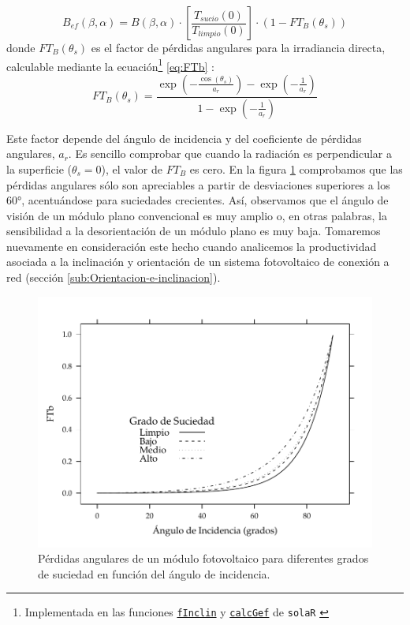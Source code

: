 \begin{equation}
B_{ef}(\beta,\alpha)=B(\beta,\alpha)\cdot\left[\frac{T_{sucio}(0)}{T_{limpio}(0)}\right]\cdot(1-FT_{B}(\theta_{s}))\label{eq:Bef}\end{equation}
donde $FT_{B}(\theta_{s})$
es el factor de pérdidas angulares para la irradiancia directa, calculable
mediante la ecuación\footnote{Implementada en las funciones
  \href{http://search.r-project.org/R/library/solaR/html/fInclin.html}{\texttt{fInclin}}
  y
  \href{http://search.r-project.org/R/library/solaR/html/calcGef.html}{\texttt{calcGef}}
  de \texttt{solaR} \cite{Perpinan2012b}} \ref{eq:FTb} \cite{Martin.Ruiz2001}: 
\begin{equation}
FT_{B}(\theta_{s})=\frac{\exp(-\frac{\cos(\theta_{s})}{a_{r}})-\exp(-\frac{1}{a_{r}})}{1-\exp(-\frac{1}{a_{r}})}
\label{eq:FTb}
\end{equation}


Este factor depende del ángulo de incidencia y del coeficiente de
pérdidas angulares, $a_{r}$. Es sencillo comprobar que cuando la
radiación es perpendicular a la superficie ($\theta_{s}=0$), el valor
de $FT_{B}$ es cero. En la figura \ref{fig:PerdidasAngulares} comprobamos
que las pérdidas angulares sólo son apreciables a partir de desviaciones
superiores a los $\ang{60}$, acentuándose para suciedades crecientes.
Así, observamos que el ángulo de visión de un módulo plano convencional
es muy amplio o, en otras palabras, la sensibilidad a la desorientación
de un módulo plano es muy baja. Tomaremos nuevamente en consideración
este hecho cuando analicemos la productividad asociada a la inclinación
y orientación de un sistema fotovoltaico de conexión a red (sección
\ref{sub:Orientacion-e-inclinacion}).

%
\begin{figure}
\includegraphics[scale=0.7]{../figs/Suciedad}

\caption{Pérdidas angulares de un módulo fotovoltaico para diferentes grados
de suciedad en función del ángulo de incidencia.\label{fig:PerdidasAngulares} }

\end{figure}


